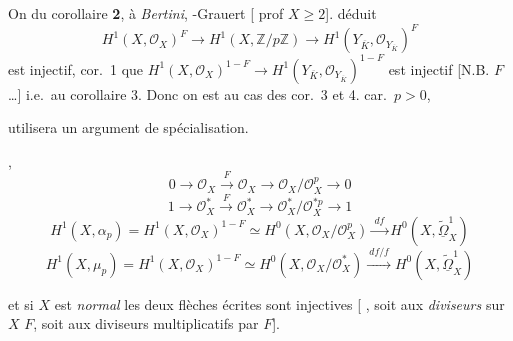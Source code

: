 \documentclass[11pt,a4paper]{article}
\begin{document}
On  du corollaire \textbf{2},   à \emph{Bertini}, -Grauert [ \struck{\ill{}} prof $X \geqslant 2$].  \struck{\ill{}}  déduit
\[
  H^1(X, \mathcal{O}_X)^F \to H^1(X, \mathbb{Z}/p\mathbb{Z}) \longrightarrow H^1(Y_{\overline{K}}, \mathcal{O}_{Y_{\overline{K}}})^F
\]
est injectif,      cor.~1   que $H^1(X, \mathcal{O}_X)^{1-F} \to H^1(Y_{\overline{K}}, \mathcal{O}_{Y_{\overline{K}}})^{1-F}$ est injectif [N.B. \ill{} \ill{} \ill{}  \ill{}    $F$…] i.e.\ au corollaire 3. Donc on est  \struck{\ill{}}  \struck{\ill{}} au cas des cor.~3 et 4.  car.\ $p > 0$,

 utilisera un argument de spécialisation.

 \struck{\ill{} \ill{}}  ,    
\[
  0 \to \mathcal{O}_X \xrightarrow{\ F\ } \mathcal{O}_X \to \mathcal{O}_X/\mathcal{O}_X^p \to 0
\]
\[
  1 \to \mathcal{O}_X^* \xrightarrow{\ F\ } \mathcal{O}_X^* \to \mathcal{O}_X^*/\mathcal{O}_X^{*p} \to 1
\]
\struck{\ill{}}  
\[
  H^1(X, \alpha_p) = H^1(X, \mathcal{O}_X)^{1-F} \simeq H^0(X, \mathcal{O}_X/\mathcal{O}_X^p) \xrightarrow{\ df\ } H^0(X, \widetilde{\underline{\Omega}}^1_X)
\]
\[
  H^1(X, \mu_p) = H^1(X, \mathcal{O}_X)^{1-F} \simeq H^0(X, \mathcal{O}_X/\mathcal{O}_X^*) \xrightarrow{\ df/f\ } H^0(X, \widetilde{\underline{\Omega}}^1_X)
\]

et si $X$ est \emph{normal} les deux flèches écrites sont injectives [\struck{\ill{}}      , soit aux \emph{diviseurs} \emph{} sur $X$ \ill{}  $F$, soit aux diviseurs multiplicatifs  par $F$].
\end{document}
